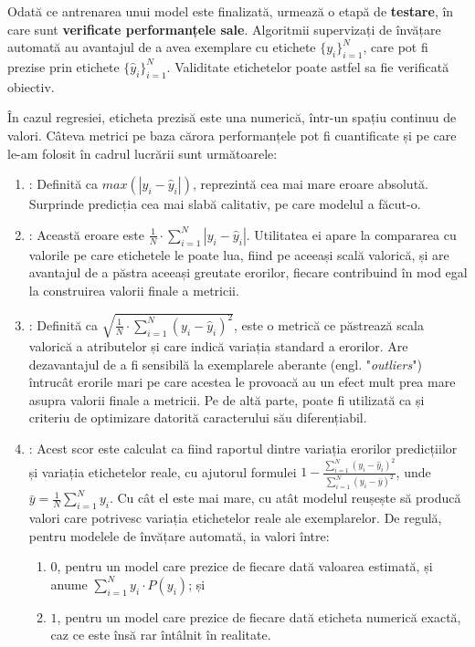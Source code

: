 \documentclass[../../main.tex]{subfiles}
\begin{document}
Odată ce antrenarea unui model este finalizată, urmează o etapă de \textbf{testare}, în care sunt \textbf{verificate performanțele sale}. Algoritmii supervizați de învățare automată au avantajul de a avea exemplare cu etichete $ \{y_{i}\}_{i=1}^{N} $, care pot fi prezise prin etichete $ \{\hat{y}_{i}\}_{i=1}^{N} $. Validitate etichetelor poate astfel sa fie verificată obiectiv.

În cazul regresiei, eticheta prezisă este una numerică, într-un spațiu continuu de valori. Câteva metrici pe baza cărora performanțele pot fi cuantificate și pe care le-am folosit în cadrul lucrării sunt următoarele:

\begin{enumerate}
    \item {}: Definită ca $ max(|y_{i} - \hat{y}_{i}|) $, reprezintă cea mai mare eroare absolută. Surprinde predicția cea mai slabă calitativ, pe care modelul a făcut-o.
    \item {}: Această eroare este $ \frac{1}{N} \cdot \sum_{i=1}^{N} |y_{i} - \hat{y}_{i}| $. Uti\-litatea ei apare la compararea cu valorile pe care etichetele le poate lua, fiind pe aceeași scală valorică, și are avantajul de a păstra aceeași greutate erorilor, fiecare contribuind în mod egal la construirea valorii finale a metricii.
    \item {}: Definită ca $ \sqrt{ \frac{1}{N} \cdot \sum_{i=1}^{N} (y_{i} - \hat{y}_{i})^{2} } $, este o metrică ce păstrează scala valorică a atributelor și care indică variația standard a erorilor. Are dezavantajul de a fi sensibilă la exemplarele aberante (engl. "\textit{outliers}") întrucât erorile mari pe care acestea le provoacă au un efect mult prea mare asupra valorii finale a metricii. Pe de altă parte, poate fi utilizată ca și criteriu de optimizare datorită caracterului său diferențiabil.
    \item {}:  Acest scor este calculat ca fiind raportul dintre variația erorilor predicțiilor și variația etichetelor reale, cu ajutorul formulei $ 1 - \frac{\sum_{i=1}^{N} (y_i - \hat{y}_i)^2}{\sum_{i=1}^{N} (y_i - \bar{y})^2} $, unde $ \bar{y} = \frac{1}{N} \sum_{i=1}^{N} y_i $. Cu cât el este mai mare, cu atât modelul reușește să producă valori care potrivesc variația etichetelor reale ale exemplarelor. De regulă, pentru modelele de învățare automată, ia valori între:
    \begin{enumerate}
        \item $ 0 $, pentru un model care prezice de fiecare dată valoarea estimată, și anume $ \sum_{i=1}^{N} y_i \cdot P(y_i) $; și
        \item $ 1 $, pentru un model care prezice de fiecare dată eticheta numerică exactă, caz ce este însă rar întâlnit în realitate.
    \end{enumerate}
\end{enumerate}
\end{document}
